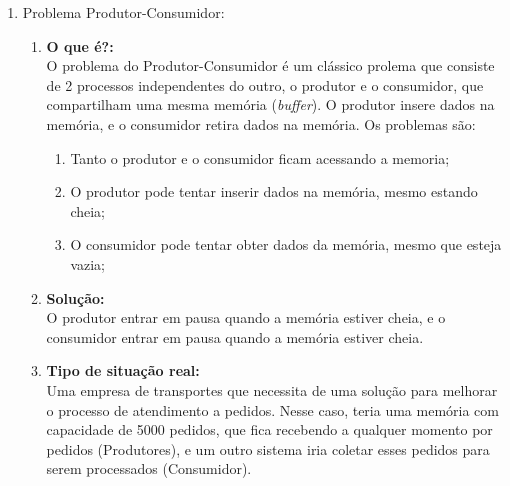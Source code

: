 \documentclass[a4paper, article]{article}
\begin{document}
\begin{enumerate}
\begin{enumerate}
            \end{enumerate}
        \item Problema Produtor-Consumidor:
            \begin{enumerate}
                \item\textbf{O que é?:}\\
                    O problema do Produtor-Consumidor é um clássico prolema que consiste de 2 processos
                    independentes do outro, o produtor e o consumidor, que compartilham uma mesma memória
                    (\textit{buffer}). O produtor insere dados na memória, e o consumidor retira dados na memória.
                    Os problemas são:
                    \begin{enumerate}
                        \item Tanto o produtor e o consumidor ficam acessando a memoria; 
                        \item O produtor pode tentar inserir dados na memória, mesmo estando cheia;
                        \item O consumidor pode tentar obter dados da memória, mesmo que esteja vazia;
                    \end{enumerate}
                \item\textbf{Solução:}\\
                    O produtor entrar em pausa quando a memória estiver cheia, e o consumidor entrar em pausa
                    quando a memória estiver cheia.
                \item\textbf{Tipo de situação real:}\\
                    Uma empresa de transportes que necessita de uma solução para melhorar o processo de
                    atendimento a pedidos. Nesse caso, teria uma memória com capacidade de 5000 pedidos, que
                    fica recebendo a qualquer momento por pedidos (Produtores), e um outro sistema iria coletar esses
                    pedidos para serem processados (Consumidor).
            \end{enumerate}
    \end{enumerate}
\end{document}

